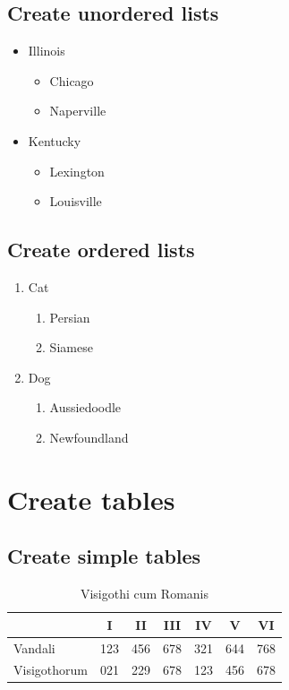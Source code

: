 \subsection{Create unordered lists}\label{sec:unordered_list}
\begin{itemize}
    \item Illinois
        \begin{itemize} \item Chicago \item Naperville \end{itemize}
    \item Kentucky
        \begin{itemize} \item Lexington \item Louisville \end{itemize}
\end{itemize}

\subsection{Create ordered lists}\label{sec:ordered_list}
\begin{enumerate}
    \item Cat
        \begin{enumerate}
            \item Persian
            \item Siamese
        \end{enumerate}
    \item Dog
        \begin{enumerate}
            \item Aussiedoodle
            \item Newfoundland
        \end{enumerate}
\end{enumerate}

\section{Create tables}\label{sec:tables}

\subsection{Create simple tables}\label{sec:simple_table}
\begin{longtable}[l]{lcccccc}
    \caption{Visigothi cum Romanis} \label{tab:visigothi_cum_romanis} \\
    \toprule
                 & I   & II  & III & IV  & V   & VI \\
    \midrule
    \endhead %
    Vandali      & 123 & 456 & 678 & 321 & 644 & 768  \\
    Visigothorum & 021 & 229 & 678 & 123 & 456 & 678  \\
    \bottomrule
\end{longtable}

